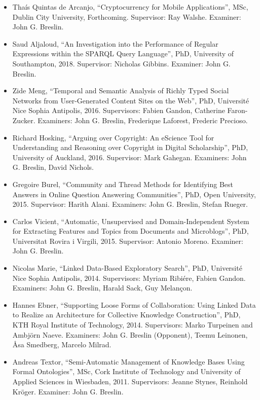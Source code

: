 \documentclass[10pt,a4paper]{res} %
\begin{document}
\begin{resume}
\begin{itemize}
\item Tha\'{i}s Quintas de Arcanjo, ``Cryptocurrency for Mobile Applications'', MSc, Dublin City University, Forthcoming. Supervisor: Ray Walshe. Examiner: John G. Breslin.
\item Saud Aljaloud, ``An Investigation into the Performance of Regular Expressions within the SPARQL Query Language'', PhD, University of Southampton, 2018. Supervisor: Nicholas Gibbins. Examiner: John G. Breslin. %
\item Zide Meng, ``Temporal and Semantic Analysis of Richly Typed Social Networks from User-Generated Content Sites on the Web'', PhD, Universit\'{e} Nice Sophia Antipolis, 2016. Supervisors: Fabien Gandon, Catherine Faron-Zucker. Examiners: John G. Breslin, Frederique Laforest, Frederic Precioso. %
\item Richard Hosking, ``Arguing over Copyright: An eScience Tool for Understanding and Reasoning over Copyright in Digital Scholarship'', PhD, University of Auckland, 2016. Supervisor: Mark Gahegan. Examiners: John G. Breslin, David Nichols.
\item Gregoire Burel, ``Community and Thread Methods for Identifying Best Answers in Online Question Answering Communities'', PhD, Open University, 2015. Supervisor: Harith Alani. Examiners: John G. Breslin, Stefan Rueger. %
\item Carlos Vicient, ``Automatic, Unsupervised and Domain-Independent System for Extracting Features and Topics from Documents and Microblogs'', PhD, Universitat Rovira i Virgili, 2015. Supervisor: Antonio Moreno. Examiner: John G. Breslin.
\item Nicolas Marie, ``Linked Data-Based Exploratory Search'', PhD, Universit\'{e} Nice Sophia Antipolis, 2014. Supervisors: Myriam Ribi\'{e}re, Fabien Gandon. Examiners: John G. Breslin, Harald Sack, Guy Melan\c{c}on.
\item Hannes Ebner, ``Supporting Loose Forms of Collaboration: Using Linked Data to Realize an Architecture for Collective Knowledge Construction'', PhD, KTH Royal Institute of Technology, 2014. Supervisors: Marko Turpeinen and Ambj{\"o}rn Naeve. Examiners: John G. Breslin (Opponent), Teemu Leinonen, \r{A}sa Smedberg, Marcelo Milrad.
\item Andreas Textor, ``Semi-Automatic Management of Knowledge Bases Using Formal Ontologies'', MSc, Cork Institute of Technology and University of Applied Sciences in Wiesbaden, 2011. Supervisors: Jeanne Stynes, Reinhold Kr{\"o}ger. Examiner: John G. Breslin.
\end{itemize}


\end{resume}
\end{document}
